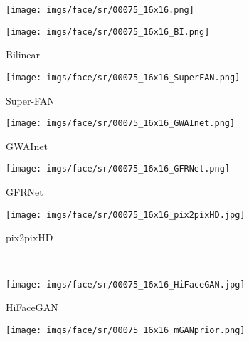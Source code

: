 \documentclass[final]{cvpr}
\begin{document}
\begin{figure*}[ht!]
\centering
    \begin{subfigure}[t!]{.16\textwidth}
        \centering
        \texttt{[image: imgs/face/sr/00075\_16x16.png]}
\caption*{}
    \end{subfigure} 
    \begin{subfigure}[t!]{.16\textwidth}
        \texttt{[image: imgs/face/sr/00075\_16x16\_BI.png]}
        \vspace*{-5mm}
        \caption{Bilinear}
    \end{subfigure} 
    \begin{subfigure}[t!]{.16\textwidth}
        \texttt{[image: imgs/face/sr/00075\_16x16\_SuperFAN.png]}
        \vspace*{-5mm}
        \caption{Super-FAN \protect\cite{Bulat2018SuperFAN}}
    \end{subfigure} 
    \begin{subfigure}[t!]{.16\textwidth}
        \texttt{[image: imgs/face/sr/00075\_16x16\_GWAInet.png]}
        \vspace*{-5mm}
        \caption{GWAInet \protect\cite{Dogan2019Exemplar}}
    \end{subfigure} 
    \begin{subfigure}[t!]{.16\textwidth}
        \texttt{[image: imgs/face/sr/00075\_16x16\_GFRNet.png]}
        \vspace*{-5mm}
        \caption{GFRNet \protect\cite{Li2018GFRNet}}
    \end{subfigure} 
    \begin{subfigure}[t!]{.16\textwidth}
        \texttt{[image: imgs/face/sr/00075\_16x16\_pix2pixHD.jpg]}
        \vspace*{-5mm}
        \caption{pix2pixHD \protect\cite{Wang2018Pix2PixHD}}
    \end{subfigure} 
    \\
    \begin{subfigure}[t!]{.16\textwidth}
        \texttt{[image: imgs/face/sr/00075\_16x16\_HiFaceGAN.jpg]}
        \vspace*{-5mm}
        \caption{HiFaceGAN \protect\cite{Yang2020HiFaceGANFR}}
    \end{subfigure} 
    \begin{subfigure}[t!]{.16\textwidth}
        \texttt{[image: imgs/face/sr/00075\_16x16\_mGANprior.png]}
        \vspace*{-5mm}

\end{subfigure}
\end{figure*}
\end{document}
